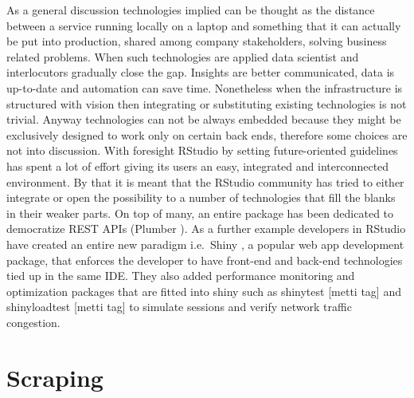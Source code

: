 \documentclass[
  12pt,
  a4paper,
  oneside]{book}
\theoremstyle{definition}
\theoremstyle{definition}
\theoremstyle{definition}
\theoremstyle{remark}
\begin{document}
As a general discussion technologies implied can be thought as the distance between a service running locally on a laptop and something that it can actually be put into production, shared among company stakeholders, solving business related problems. When such technologies are applied data scientist and interlocutors gradually close the gap. Insights are better communicated, data is up-to-date and automation can save time. Nonetheless when the infrastructure is structured with vision then integrating or substituting existing technologies is not trivial. Anyway technologies can not be always embedded because they might be exclusively designed to work only on certain back ends, therefore some choices are not into discussion. With foresight RStudio by setting future-oriented guidelines has spent a lot of effort giving its users an easy, integrated and interconnected environment. By that it is meant that the RStudio community has tried to either integrate or open the possibility to a number of technologies that fill the blanks in their weaker parts. On top of many, an entire package has been dedicated to democratize REST APIs (Plumber \citep{plumber}). As a further example developers in RStudio have created an entire new paradigm i.e.~Shiny \citep{shiny}, a popular web app development package, that enforces the developer to have front-end and back-end technologies tied up in the same IDE. They also added performance monitoring and optimization packages that are fitted into shiny such as shinytest {[}metti tag{]} and shinyloadtest {[}metti tag{]} to simulate sessions and verify network traffic congestion.

\hypertarget{scraping}{%
\chapter{Scraping}\label{scraping}}
\end{document}
